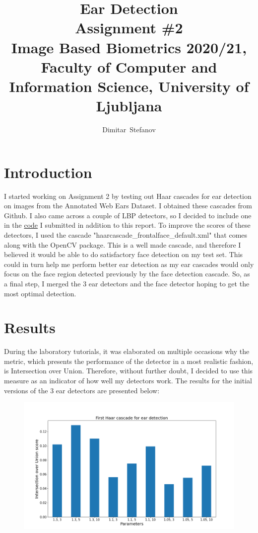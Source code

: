 \documentclass[9pt]{IEEEtran}
\title{\vspace{0ex} %
Ear Detection
\\ \large{Assignment \#2}\\ \normalsize{Image Based Biometrics 2020/21, Faculty of Computer and Information Science, University of Ljubljana}}
\author{ %
Dimitar~Stefanov
\vspace{-4.0ex}
}
\begin{document}
\maketitle

\section{Introduction}
I started working on Assignment 2 by testing out Haar cascades for ear detection on images from the Annotated Web Ears Dataset. I obtained these cascades from Github. I also came across a couple of LBP detectors, so I decided to include one in the \href{https://github.com/dstefanov46/IBB_Assignment2}{code} I submitted in addition to this report. To improve the scores of these detectors, I used the cascade "haarcascade\_frontalface\_default.xml" that comes along with the OpenCV package. This is a well made cascade, and therefore I believed it would be able to do satisfactory face detection on my test set. This could in turn help me perform better ear detection as my ear cascades would only focus on the face region detected previously by the face detection cascade. So, as a final step, I merged the 3 ear detectors and the face detector hoping to get the most optimal detection.

\section{Results}
During the laboratory tutorials, it was elaborated on multiple occasions why the metric, which presents the performance of the detector in a most realistic fashion, is Intersection over Union. Therefore, without further doubt, I decided to use this measure as an indicator of how well my detectors work. The results for the initial versions of the 3 ear detectors are presented below:

\begin{figure}[H]
    \centering
    \includegraphics[width=1\columnwidth]{plot_1.1}
    \label{fig:plot_1.1}
\end{figure}
\end{document}
